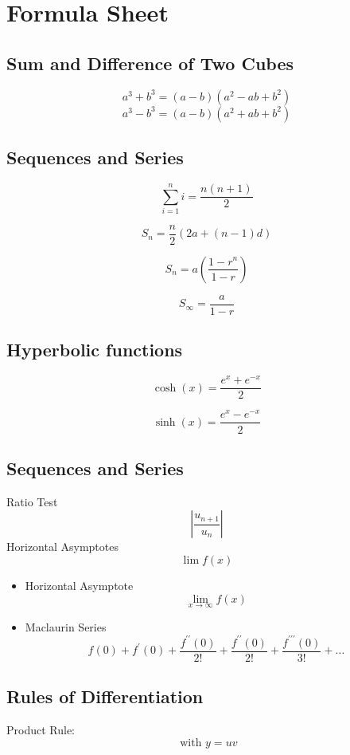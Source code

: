 \documentclass[a4paper,12pt]{article}
\begin{document}
	
\section*{Formula Sheet}

\subsection*{Sum and Difference of Two Cubes}
\[ a^3 + b^3 = (a-b)(a^2 - ab + b^2)\]
\[ a^3 - b^3 = (a-b)(a^2 + ab + b^2)\]


\subsection*{Sequences and Series}

\[ \sum_{i=1}^{n} i = \frac{n(n+1)}{2}\]

\[ S_n = \frac{n}{2} \left(2a + (n-1) d \right)\]

\[ S_n = a\left(\frac{1-r^n}{1-r}\right)\]

\[ S_\infty = \frac{a}{1-r}\]
	

\subsection*{Hyperbolic functions}
\[ \cosh(x) = \frac{e^x + e^{-x}}{2}\]

\[ \sinh(x) = \frac{e^x - e^{-x}}{2}\]


\subsection*{Sequences and Series}
Ratio Test
\[ | \frac{u_{n+1}}{u_n} | \]
Horizontal Asymptotes
\[ \lim f(x) \]


\begin{itemize}
	\item Horizontal Asymptote
	\[ \lim_{x \to \infty } f(x) \]
	\item Maclaurin Series
	\[f(0) + f^{\prime}(0) + \frac{f^{\prime \prime}(0)}{2!} + \frac{f^{\prime \prime}(0)}{2!} + \frac{f^{\prime\prime \prime}(0)}{3!} + \ldots \]
\end{itemize}




\subsection*{Rules of Differentiation}
\noindent Product Rule: \[\mbox{ with }y = uv\]
\end{document}
